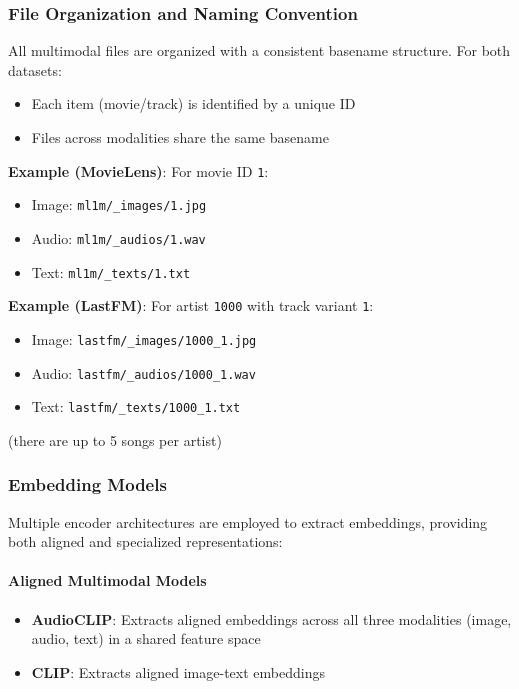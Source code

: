 \subsubsection{File Organization and Naming Convention}

All multimodal files are organized with a consistent basename structure. For both datasets:
\begin{itemize}
    \item Each item (movie/track) is identified by a unique ID
    \item Files across modalities share the same basename
\end{itemize}

\textbf{Example (MovieLens)}: For movie ID \texttt{1}:
\begin{itemize}
    \item Image: \texttt{ml1m/\_images/1.jpg}
    \item Audio: \texttt{ml1m/\_audios/1.wav}
    \item Text: \texttt{ml1m/\_texts/1.txt}
\end{itemize}

\textbf{Example (LastFM)}: For artist \texttt{1000} with track variant \texttt{1}:
\begin{itemize}
    \item Image: \texttt{lastfm/\_images/1000\_1.jpg}
    \item Audio: \texttt{lastfm/\_audios/1000\_1.wav}
    \item Text: \texttt{lastfm/\_texts/1000\_1.txt}
\end{itemize}
(there are up to 5 songs per artist)

\subsubsection{Embedding Models}

Multiple encoder architectures are employed to extract embeddings, providing both aligned and specialized representations:

\paragraph{Aligned Multimodal Models}
\begin{itemize}
    \item \textbf{AudioCLIP}: Extracts aligned embeddings across all three modalities (image, audio, text) in a shared feature space
    \item \textbf{CLIP}: Extracts aligned image-text embeddings
\end{itemize}

